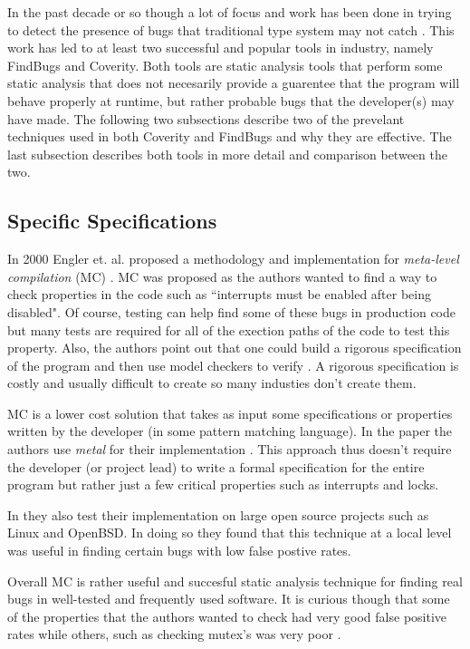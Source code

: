 \documentclass[10pt,oneside]{IEEEtran}
\begin{document}
In the past decade or so though a lot of focus and work has been done in trying to detect the presence of bugs that traditional type system may not catch \cite{8}. This work has led to at least two successful and popular tools in industry, namely FindBugs and Coverity. Both tools are static analysis tools that perform some static analysis that does not necesarily provide a guarentee that the program will behave properly at runtime, but rather probable bugs that the developer(s) may have made. The following two subsections describe two of the prevelant techniques used in both Coverity and FindBugs and why they are effective. The last subsection describes both tools in more detail and comparison between the two.

\subsection{Specific Specifications}
In 2000 Engler et. al. proposed a methodology and implementation for \textit{meta-level compilation} (MC) \cite{5}. MC was proposed as the authors wanted to find a way to check properties in the code such as ``interrupts must be enabled after being disabled". Of course, testing can help find some of these bugs in production code but many tests are required for all of the exection paths of the code to test this property. Also, the authors point out that one could build a rigorous specification of the program and then use model checkers to verify \cite{5}. A rigorous specification is costly and usually difficult to create so many industies don't create them.

MC is a lower cost solution that takes as input some specifications or properties written by the developer (in some pattern matching language). In the paper the authors use \textit{metal} for their implementation \cite{5}. This approach thus doesn't require the developer (or project lead) to write a formal specification for the entire program but rather just a few critical properties such as interrupts and locks.

In \cite{5} they also test their implementation on large open source projects such as Linux and OpenBSD. In doing so they found that this technique at a local level was useful in finding certain bugs with low false postive rates.


Overall MC is rather useful and succesful static analysis technique for finding real bugs in well-tested and frequently used software. It is curious though that some of the properties that the authors wanted to check had very good false positive rates while others, such as checking mutex's was very poor \cite{5}.
\end{document}
